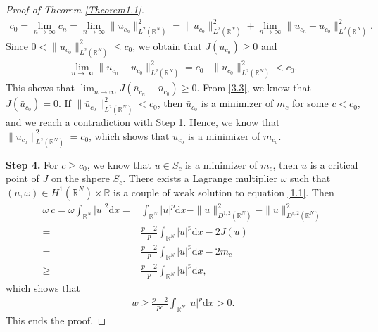 \documentclass[12pt,a4paper,reqno]{amsart}
\numberwithin{equation}{section}
\begin{document}
\begin{proof}[Proof of Theorem \ref{Theorem1.1}]
\begin{equation*}
\begin{aligned}
c_{0}
=
\lim_{n\to\infty}
c_{n}
=
\lim_{n\to\infty}
\|\bar{u}_{c_{n}}\|_{L^{2}(\mathbb{R}^{N})}^{2}
=
\|\bar{u}_{c_{0}}\|_{L^{2}(\mathbb{R}^{N})}^{2}
+
\lim_{n\to\infty}
\|\bar{u}_{c_{n}}-\bar{u}_{c_{0}}\|_{L^{2}(\mathbb{R}^{N})}^{2}.
\end{aligned}
\end{equation*}
Since $0<\|\bar{u}_{c_{0}}\|_{L^{2}(\mathbb{R}^{N})}^{2}\leqslant c_{0}$,
we obtain that $J(\bar{u}_{c_{0}})\geqslant 0$
and
\begin{equation*}
\begin{aligned}
\lim_{n\to\infty}
\|\bar{u}_{c_{n}}-\bar{u}_{c_{0}}\|_{L^{2}(\mathbb{R}^{N})}^{2}
=
c_{0}
-
\|\bar{u}_{c_{0}}\|_{L^{2}(\mathbb{R}^{N})}^{2}<c_{0}.
\end{aligned}
\end{equation*}
This shows that
$\lim_{n\to\infty}J(\bar{u}_{c_{n}}-\bar{u}_{c_{0}})\geqslant 0$.
From \eqref{3.3},
we know that $J(\bar{u}_{c_{0}})=0$.
If $\|\bar{u}_{c_{0}}\|_{L^{2}(\mathbb{R}^{N})}^{2}<c_{0}$,
then $\bar{u}_{c_{0}}$ is a minimizer of $m_{c}$ for some $c<c_{0}$,
and we reach a contradiction with Step 1.
Hence, we know that $\|\bar{u}_{c_{0}}\|_{L^{2}(\mathbb{R}^{N})}^{2}=c_{0}$,
which shows that $\bar{u}_{c_{0}}$ is a minimizer of $m_{c_{0}}$.

{\bf Step 4.} For $c\geqslant c_{0}$, we know that $u\in S_{c}$ is a minimizer of $m_{c}$, then $u$ is a critical point of $J$ on the shpere $S_{c}$. There exists a Lagrange multiplier $\omega$ such that $(u,\omega)\in H^{1}(\mathbb{R}^{N})\times \mathbb{R}$ is a couple of weak solution to equation \eqref{1.1}.
Then
\begin{equation*}
\begin{aligned}
\omega\ c=\omega \int_{\mathbb{R}^{N}}|u|^{2}\mathrm{d}x
=&\int_{\mathbb{R}^{N}}|u|^{p}\mathrm{d}x
-\|u\|_{D^{1,2}(\mathbb{R}^{N})}^{2}
-\|u\|_{D^{s,2}(\mathbb{R}^{N})}^{2}\\
=&\frac{p-2}{p}
\int_{\mathbb{R}^{N}}|u|^{p}\mathrm{d}x-2J(u)\\
=&\frac{p-2}{p}
\int_{\mathbb{R}^{N}}|u|^{p}\mathrm{d}x-2m_{c}\\
\geqslant&\frac{p-2}{p}
\int_{\mathbb{R}^{N}}|u|^{p}\mathrm{d}x,
\end{aligned}
\end{equation*}
which shows that
\begin{equation*}
\begin{aligned}
w\geqslant \frac{p-2}{pc}
\int_{\mathbb{R}^{N}}|u|^{p}\mathrm{d}x>0.
\end{aligned}
\end{equation*}
This ends the proof.
\end{proof}
\end{document}
